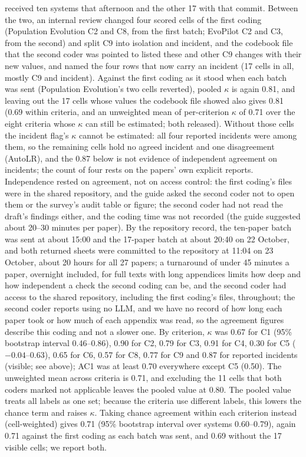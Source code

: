 \documentclass[sigconf,nonacm]{acmart}
\begin{document}
received ten systems that afternoon and the other 17 with that commit. Between the two, an internal review changed four
scored cells of the first coding (Population Evolution C2 and C8, from the first batch; EvoPilot C2 and C3, from the
second) and split C9 into isolation and incident, and the codebook file that the second coder was pointed to listed
these and other C9 changes with their new values, and named the four rows that now carry an incident (17 cells in all, mostly C9 and incident). Against the first coding as it stood when
each batch was sent (Population Evolution's two cells reverted), pooled $\kappa$ is again 0.81, and leaving out the 17
cells whose values the codebook file showed also gives 0.81 (0.69 within criteria, and an unweighted mean of per-criterion $\kappa$ of 0.71 over the eight criteria whose $\kappa$ can still be estimated; both released). Without those cells the incident flag's $\kappa$ cannot be estimated: all four reported incidents were among them, so the remaining cells hold no agreed incident and one disagreement (AutoLR), and the 0.87 below is not evidence of independent agreement on incidents; the count of four rests on the papers' own explicit reports. Independence rested on agreement, not on access control: the first coding's files were in the shared repository, and the guide asked the second coder not to open them or the survey's audit table or figure; the second coder had not read the draft's findings either, and the coding time was not recorded (the guide suggested about 20--30 minutes per paper). By the repository record, the ten-paper batch was sent at about 15:00 and the 17-paper batch at about 20:40 on 22 October, and both returned sheets were committed to the repository at 11:04 on 23 October, about 20 hours for all 27 papers; a turnaround of under 45 minutes a paper, overnight included, for full texts with long appendices limits how deep and how independent a check the second coding can be, and the second coder had access to the shared repository, including the first coding's files, throughout; the second coder reports using no LLM, and we have no record of how long each paper took or how much of each appendix was read, so the agreement figures describe this coding and not a slower one. By criterion, $\kappa$ was 0.67 for C1
(95\% bootstrap interval 0.46--0.86), 0.90 for C2, 0.79 for C3, 0.91 for C4, 0.30 for C5 ($-0.04$--0.63), 0.65 for
C6, 0.57 for C8, 0.77 for C9 and 0.87 for reported incidents (visible; see above); AC1 was at least 0.70 everywhere except C5 (0.50). The
unweighted mean across criteria is 0.71, and excluding the 11 cells that both coders marked not applicable leaves the
pooled value at 0.80. The pooled value treats all labels as one set; because the criteria use different labels, this lowers the chance term and raises $\kappa$. Taking chance agreement within each criterion instead (cell-weighted) gives 0.71 (95\% bootstrap interval over systems 0.60--0.79), again 0.71 against the first coding as each batch was sent, and 0.69 without the 17 visible cells; we report both.
\end{document}
